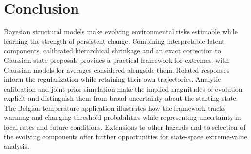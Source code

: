 \documentclass[11pt,a4paper]{article}
\begin{document}
	\section{Conclusion}\label{sec:conclusion}
	
	Bayesian structural models make evolving environmental risks estimable
	while learning the strength of persistent change. Combining interpretable
	latent components, calibrated hierarchical shrinkage and an exact
correction to Gaussian state proposals provides a practical framework for
extremes, with Gaussian models for averages considered alongside them.
Related responses inform the regularization while retaining their own
trajectories. Analytic calibration and joint prior simulation make the
implied magnitudes of evolution explicit and distinguish them from broad
uncertainty about the starting state. The Belgian temperature application illustrates how the
framework tracks
	warming and changing threshold probabilities while representing uncertainty
	in local rates and future conditions. Extensions to other hazards and to
	selection of the evolving components offer further opportunities for
	state-space extreme-value analysis.
	
	\FloatBarrier
	
\end{document}
